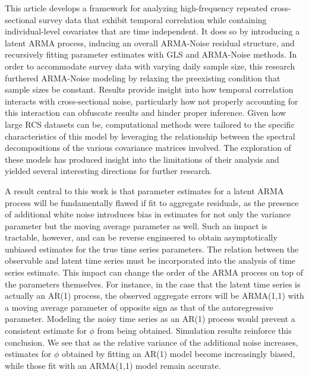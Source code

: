 This article develops a framework for analyzing high-frequency repeated cross-sectional survey data that exhibit temporal correlation while containing individual-level covariates that are time independent. It does so by introducing a latent ARMA process, inducing an overall ARMA-Noise residual structure, and recursively fitting parameter estimates with GLS and ARMA-Noise methods. In order to accommodate survey data with varying daily sample size, this research furthered ARMA-Noise modeling by relaxing the preexisting condition that sample sizes be constant. Results provide insight into how temporal correlation interacts with cross-sectional noise, particularly how not properly accounting for this interaction can obfuscate results and hinder proper inference. Given how large RCS datasets can be, computational methods were tailored to the specific characteristics of this model by leveraging the relationship between the spectral decompositions of the various covariance matrices involved. The exploration of these models has produced insight into the limitations of their analysis and yielded several interesting directions for further research.

A result central to this work is that parameter estimates for a latent ARMA process will be fundamentally flawed if fit to aggregate residuals, as the presence of additional white noise introduces bias in estimates for not only the variance parameter but the moving average parameter as well. Such an impact is tractable, however, and can be reverse engineered to obtain asymptotically unbiased estimates for the true time series parameters. The relation between the observable and latent time series must be incorporated into the analysis of time series estimate. This impact can change the order of the ARMA process on top of the parameters themselves. For instance, in the case that the latent time series is actually an AR(1) process, the observed aggregate errors will be ARMA(1,1) with a moving average parameter of opposite sign as that of the autoregressive parameter. Modeling the noisy time series as an AR(1) process would prevent a consistent estimate for $\phi$ from being obtained. Simulation results reinforce this conclusion. We see that as the relative variance of the additional noise increases, estimates for $\phi$ obtained by fitting an AR(1) model become increasingly biased, while those fit with an ARMA(1,1) model remain accurate.


